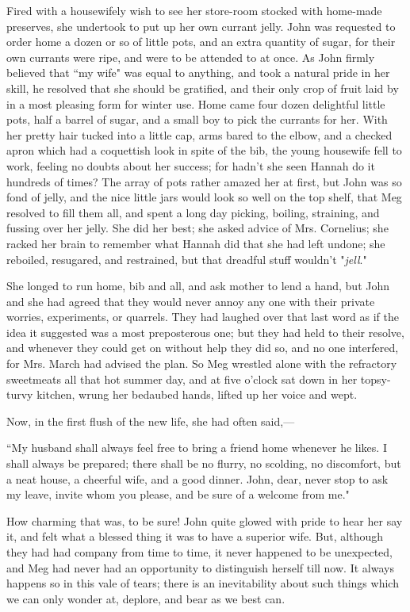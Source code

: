 Fired with a housewifely wish to see her store-room stocked with
home-made preserves, she undertook to put up her own currant jelly. John
was requested to order home a dozen or so of little pots, and an extra
quantity of sugar, for their own currants were ripe, and were to be
attended to at once. As John firmly believed that ``my wife" was equal to
anything, and took a natural pride in her skill, he resolved that she
should be gratified, and their only crop of fruit laid by in a most
pleasing form for winter use. Home came four dozen delightful little
pots, half a barrel of sugar, and a small boy to pick the currants for
her. With her pretty hair tucked into a little cap, arms bared to the
elbow, and a checked apron which had a coquettish look in spite of the
bib, the young housewife fell to work, feeling no doubts about her
success; for hadn't she seen Hannah do it hundreds of
times? The array of pots rather amazed her at first, but John was so
fond of jelly, and the nice little jars would look so well on the top
shelf, that Meg resolved to fill them all, and spent a long day picking,
boiling, straining, and fussing over her jelly. She did her best; she
asked advice of Mrs. Cornelius; she racked her brain to remember what
Hannah did that she had left undone; she reboiled, resugared, and
restrained, but that dreadful stuff wouldn't
"\emph{jell}."

She longed to run home, bib and all, and ask mother to lend a hand, but
John and she had agreed that they would never annoy any one with their
private worries, experiments, or quarrels. They had laughed over that
last word as if the idea it suggested was a most preposterous one; but
they had held to their resolve, and whenever they could get on without
help they did so, and no one interfered, for Mrs. March had advised the
plan. So Meg wrestled alone with the refractory sweetmeats all that hot
summer day, and at five o'clock sat down in her
topsy-turvy kitchen, wrung her bedaubed hands, lifted up her voice and
wept.

Now, in the first flush of the new life, she had often said,---

``My husband shall always feel free to bring a friend home whenever he
likes. I shall always be prepared; there shall be no flurry, no
scolding, no discomfort, but a neat house, a cheerful wife, and a good
dinner. John, dear, never stop to ask my leave, invite whom you please,
and be sure of a welcome from me."

How charming that was, to be sure! John quite glowed with pride to hear
her say it, and felt what a blessed thing it was to have a superior
wife. But, although they had had company from time to time, it never
happened to be unexpected, and Meg had never had an opportunity to
distinguish herself till now. It always happens so in this vale of
tears; there is an inevitability about such things which we can only
wonder at, deplore, and bear as we best can.

